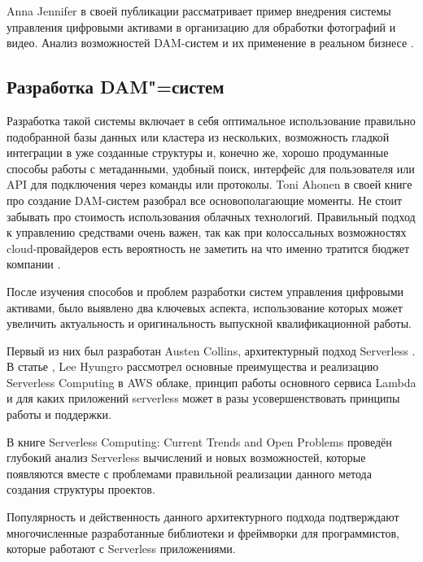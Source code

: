 Anna Jennifer в своей публикации \cite{HowToImplementDam} рассматривает пример внедрения системы управления цифровыми активами в организацию для обработки фотографий и видео. Анализ возможностей DAM-систем и их применение в реальном бизнесе \cite{DamBusinessIntegration}. 

\subsection{Разработка DAM"=систем}

Разработка такой системы включает в себя оптимальное использование правильно подобранной базы данных или кластера из нескольких, возможность гладкой интеграции в уже созданные структуры и, конечно же, хорошо продуманные способы работы с метаданными, удобный поиск, интерфейс для пользователя или API для подключения через команды или протоколы. Toni Ahonen в своей книге \cite{DamDevelopment} про создание DAM-систем разобрал все основополагающие моменты.
Не стоит забывать про стоимость использования облачных технологий. Правильный подход к управлению средствами очень важен, так как при колоссальных возможностях cloud-провайдеров есть вероятность не заметить на что именно тратится бюджет компании \cite{AwsCostsManagement}.

После изучения способов и проблем разработки систем управления цифровыми активами, было выявлено два ключевых аспекта, использование которых может увеличить актуальность и оригинальность выпускной квалификационной работы.

Первый из них был разработан Austen Collins, архитектурный подход Serverless \cite{AwsServerless}. В статье \cite{ProdServerlessEnv}, Lee Hyungro рассмотрел основные преимущества и реализацию Serverless Computing в AWS облаке, принцип работы основного сервиса Lambda и для каких приложений serverless может в разы усовершенствовать принципы работы и поддержки.

В книге Serverless Computing: Current Trends and Open Problems \cite{ServerlessTrendsAndProblems} проведён глубокий анализ Serverless вычислений и новых возможностей, которые появляются вместе с проблемами правильной реализации данного метода создания структуры проектов.

Популярность и действенность данного архитектурного подхода подтверждают \cite{ServerlessFrameworks} многочисленные разработанные библиотеки и фреймворки для программистов, которые работают с Serverless приложениями.

